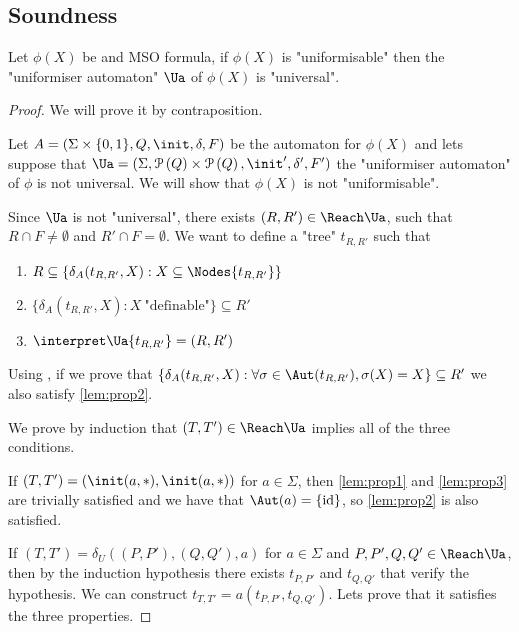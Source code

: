 \documentclass[a4paper,UKenglish,cleveref, autoref, thm-restate]{lipics-v2021}
\begin{document}
\subsection{Soundness}\label{sec:soundness}

\begin{lemma}
	Let $\phi(X)$ be and MSO formula, if $\phi(X)$ is "uniformisable" then the "uniformiser automaton" $\Ua$ of $\phi(X)$ is "universal".
\end{lemma}

\begin{proof}
	We will prove it by contraposition.

	Let $A =  (\Sigma \times \{0,1\}, Q, \init, \delta, F)$ be the automaton for $\phi(X)$ and lets suppose that
	$\Ua = (\Sigma, \parts Q \times \parts Q,\init', \delta', F')$ the "uniformiser automaton" of $\phi$ is not universal.
	We will show that $\phi(X)$ is not "uniformisable".

	Since $\Ua$ is not "universal", there exists $(R,R') \in \Reach \Ua$, such that $R \cap F \neq \emptyset$ and $R' \cap F = \emptyset$.
	We want to define a "tree" $t_{R,R'}$ such that
	\begin{enumerate}
		\item $R \subseteq \{ \delta_A (t_{R,R'},X) : X \subseteq \Nodes {t_{R,R'}}\}$ \label{lem:prop1}
		\item $\{ \delta_A (t_{R,R'},X) : X \ \text{"definable"}\} \subseteq R'$\label{lem:prop2}
		\item $\interpret \Ua {t_{R,R'}} = (R,R')$\label{lem:prop3}
	\end{enumerate}

	Using , if we prove that $\{ \delta_A (t_{R,R'},X) : \forall \sigma \in \Aut(t_{R,R'}), \sigma(X) = X\} \subseteq R'$ we also
	satisfy \ref{lem:prop2}.

	We prove by induction that $(T,T') \in \Reach \Ua$ implies all of the three conditions.

	If $(T,T') = (\init(a,*), \init (a, *))$ for $a \in \Sigma$, then \ref{lem:prop1} and \ref{lem:prop3} are trivially satisfied and we have that
	$\Aut (a) = \{\text{id}\}$, so \ref{lem:prop2} is also satisfied.

	If $(T,T') = \delta_U((P,P'),(Q,Q'),a)$ for $a \in \Sigma$ and $P,P',Q,Q' \in \Reach \Ua$, then by the induction hypothesis there exists
	$t_{P,P'}$ and $t_{Q,Q'}$ that verify the hypothesis. We can construct $t_{T,T'} = a(t_{P,P'},t_{Q,Q'})$. Lets prove that it satisfies the
	three properties.


\end{proof}
\end{document}
